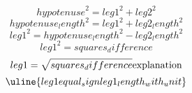 \[ {hypotenuse}^{2}={leg1}^{2}+{leg2}^{2} \]
\[ {hypotenuse_length}^{2}={leg1}^{2}+{leg2_length}^{2} \]
\[ {leg1}^{2}={hypotenuse_length}^{2}-{leg2_length}^{2} \]
\[ {leg1}^{2}={squares_difference} \]
\[ {leg1}=\sqrt{\mathstrut {squares_difference}}\text{{explanation}}\]
\[ \uline{{leg1}{equal_sign}{leg1_length_with_unit}}\]